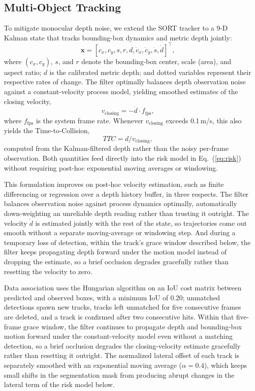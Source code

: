 \subsection{Multi-Object Tracking}
To mitigate monocular depth noise, we extend the SORT tracker to a 9-D Kalman state that tracks bounding-box dynamics and metric depth jointly:
\begin{equation}
  \mathbf{x} = [c_x, c_y, s, r, d, \dot{c}_x, \dot{c}_y, \dot{s}, \dot{d}]^\top,
  \label{eq:kalman_state}
\end{equation}
where $(c_x, c_y)$, $s$, and $r$ denote the bounding-box center, scale (area), and aspect ratio; $d$ is the calibrated metric depth; and dotted variables represent their respective rates of change. The filter optimally balances depth observation noise against a constant-velocity process model, yielding smoothed estimates of the closing velocity,
\begin{equation}
  v_{\mathrm{closing}} = -\dot{d} \cdot f_{\mathrm{fps}},
  \label{eq:closing_velocity}
\end{equation}
where $f_{\mathrm{fps}}$ is the system frame rate. Whenever $v_\mathrm{closing}$ exceeds 0.1\,m/s, this also yields the Time-to-Collision,
\begin{equation}
  TTC = d / v_{\mathrm{closing}},
  \label{eq:ttc}
\end{equation}
computed from the Kalman-filtered depth rather than the noisy per-frame observation. Both quantities feed directly into the risk model in Eq.~(\ref{eq:risk}) without requiring post-hoc exponential moving averages or windowing.

This formulation improves on post-hoc velocity estimation, such as finite differencing or regression over a depth history buffer, in three respects. The filter balances observation noise against process dynamics optimally, automatically down-weighting an unreliable depth reading rather than trusting it outright. The velocity $\dot{d}$ is estimated jointly with the rest of the state, so trajectories come out smooth without a separate moving-average or windowing step. And during a temporary loss of detection, within the track's grace window described below, the filter keeps propagating depth forward under the motion model instead of dropping the estimate, so a brief occlusion degrades gracefully rather than resetting the velocity to zero.

Data association uses the Hungarian algorithm on an IoU cost matrix between predicted and observed boxes, with a minimum IoU of 0.20; unmatched detections spawn new tracks, tracks left unmatched for five consecutive frames are deleted, and a track is confirmed after two consecutive hits. Within that five-frame grace window, the filter continues to propagate depth and bounding-box motion forward under the constant-velocity model even without a matching detection, so a brief occlusion degrades the closing-velocity estimate gracefully rather than resetting it outright. The normalized lateral offset of each track is separately smoothed with an exponential moving average ($\alpha=0.4$), which keeps small shifts in the segmentation mask from producing abrupt changes in the lateral term of the risk model below.

